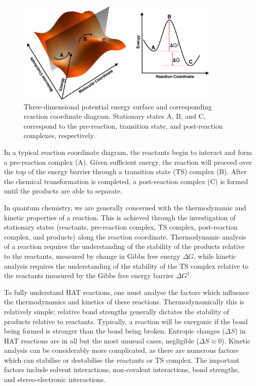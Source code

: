 \begin{figure}[htb]
  \centering
  \includegraphics[width=0.9\textwidth]{figures/pes-1}
  \caption[Three-dimensional potential energy surface and corresponding reaction coordinate diagram.]{Three-dimensional potential energy surface and corresponding reaction coordinate diagram. Stationary states A, B, and C, correspond to the pre-reaction, transition state, and post-reaction complexes, respectively.}
\label{fig:pes}
\end{figure}

\noindent In a typical reaction coordinate diagram, the reactants begin to interact and form a pre-reaction complex (A). Given sufficient energy, the reaction will proceed over the top of the energy barrier through a transition state (TS) complex (B). After the chemical transformation is completed, a post-reaction complex (C) is formed until the products are able to separate.

In quantum chemistry, we are generally concerned with the thermodynamic and kinetic properties of a reaction. This is achieved through the investigation of stationary states (reactants, pre-reaction complex, TS complex, post-reaction complex, and products) along the reaction coordinate. Thermodynamic analysis of a reaction requires the understanding of the stability of the products relative to the reactants, measured by change in Gibbs free energy $\Delta G$, while kinetic analysis requires the understanding of the stability of the TS complex relative to the reactants measured by the Gibbs free energy barrier $\Delta G^{\ddagger}$.

To fully understand HAT reactions, one must analyse the factors which influence the thermodynamics and kinetics of these reactions. Thermodynamically this is relatively simple; relative bond strengths generally dictates the stability of products relative to reactants. Typically, a reaction will be exergonic if the bond being formed is stronger than the bond being broken. Entropic changes ($\Delta S$) in HAT reactions are in all but the most unusual cases, negligible ($\Delta S \approx 0$).\cite{Mader2007} Kinetic analysis can be considerably more complicated, as there are numerous factors which can stabilise or destabilise the reactants or TS complex. The important factors include solvent interactions, non-covalent interactions, bond strengths, and stereo-electronic interactions.

